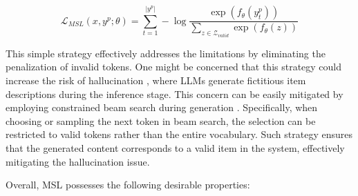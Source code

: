 \documentclass[sigconf,natbib=true]{acmart}
\begin{document}
\begin{equation}
    \mathcal{L}_{MSL}(x,y^p;\theta) = \sum_{t=1}^{|y^p|} - \log \frac{\exp(f_\theta(y_t^p))}{\sum_{z \in \mathcal{Z}_{valid}} \exp(f_\theta(z))}
\end{equation}

This simple strategy effectively addresses the limitations by eliminating the penalization of invalid tokens. 
One might be concerned that this strategy could increase the risk of hallucination \cite{ji2023towards}, where LLMs generate fictitious item descriptions during the inference stage. This concern can be easily mitigated by employing constrained beam search during generation \cite{de2020autoregressive}. Specifically, when choosing or sampling the next token in beam search, the selection can be restricted to valid tokens rather than the entire vocabulary. 
Such strategy ensures that the generated content corresponds to a valid item in the system, effectively mitigating the hallucination issue.

Overall, MSL possesses the following desirable properties:
\end{document}
